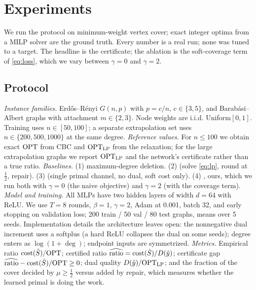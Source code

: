 \section{Experiments}\label{sec:exp}
We run the protocol on minimum-weight vertex cover; exact integer optima from a MILP solver are the ground truth. Every number is a real run; none was tuned to a target. The headline is the certificate; the ablation is the soft-coverage term of \eqref{eq:loss}, which we vary between $\gamma=0$ and $\gamma=2$.

\subsection{Protocol}
\emph{Instance families.} Erd\H{o}s--R\'enyi $G(n,p)$ with $p=c/n$, $c\in\{3,5\}$, and Barab\'asi--Albert graphs with attachment $m\in\{2,3\}$. Node weights are i.i.d. Uniform$[0,1]$. Training uses $n\in[50,100]$; a separate extrapolation set uses $n\in\{200,500,1000\}$ at the same degree.
\emph{Reference values.} For $n\le 100$ we obtain exact $\mathrm{OPT}$ from CBC and $\mathrm{OPT}_{\mathrm{LP}}$ from the relaxation; for the large extrapolation graphs we report $\mathrm{OPT}_{\mathrm{LP}}$ and the network's certificate rather than a true ratio.
\emph{Baselines.} (1) \Greedy{} maximum-degree deletion. (2) \LPRound{} (solve \eqref{eq:lp}, round at $\tfrac12$, repair). (3) \GNNplain{} (single primal channel, no dual, soft cost only). (4) \PDGNN{}, ours, which we run both with $\gamma=0$ (the naive objective) and $\gamma=2$ (with the coverage term).
\emph{Model and training.} All MLPs have two hidden layers of width $d=64$ with ReLU. We use $T=8$ rounds, $\beta=1$, $\gamma=2$, Adam at 0.001, batch 32, and early stopping on validation loss; 200 train / 50 val / 80 test graphs, means over 5 seeds. Implementation details the architecture leaves open: the nonnegative dual increment uses a softplus (a hard ReLU collapses the dual on some seeds); degree enters as $\log(1+\deg)$; endpoint inputs are symmetrized.
\emph{Metrics.} Empirical ratio $\mathrm{cost}(\hat S)/\mathrm{OPT}$; certified ratio $\widehat{\mathrm{ratio}}=\mathrm{cost}(\hat S)/D(\hat y)$; certificate gap $\widehat{\mathrm{ratio}}-\mathrm{cost}(\hat S)/\mathrm{OPT}\ge0$; dual quality $D(\hat y)/\mathrm{OPT}_{\mathrm{LP}}$; and the fraction of the cover decided by $\mu\ge\tfrac12$ versus added by repair, which measures whether the learned primal is doing the work.

